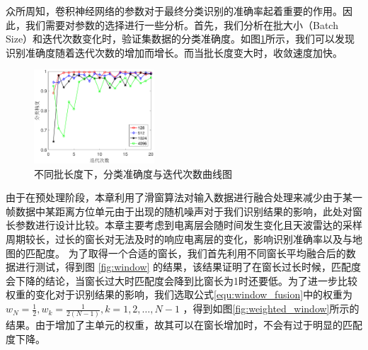 众所周知，卷积神经网络的参数对于最终分类识别的准确率起着重要的作用。因此，我们需要对参数的选择进行一些分析。首先，我们分析在批大小（Batch Size）和迭代次数变化时，验证集数据的分类准确度。如图\ref{fig:epoch}所示，我们可以发现识别准确度随着迭代次数的增加而增长。而当批长度变大时，收敛速度加快。
\begin{figure}[H]
	\centering
	\includegraphics[width=0.4\textwidth]{figures/othr/epoch}
	\caption{不同批长度下，分类准确度与迭代次数曲线图}
	\label{fig:epoch}
\end{figure}

由于在预处理阶段，本章利用了滑窗算法对输入数据进行融合处理来减少由于某一帧数据中某距离方位单元由于出现的随机噪声对于我们识别结果的影响，此处对窗长参数进行设计比较。本章主要考虑到电离层会随时间发生变化且天波雷达的采样周期较长，过长的窗长对无法及时的响应电离层的变化，影响识别准确率以及与地图的匹配度。
为了取得一个合适的窗长，我们首先利用不同窗长平均融合后的数据进行测试，得到图 \ref{fig:window} 的结果，该结果证明了在窗长过长时候，匹配度会下降的结论，当窗长过大时匹配度会降到比窗长为1时还要低。为了进一步比较权重的变化对于识别结果的影响，我们选取公式\ref{equ:window_fusion}中的权重为$w_N=\frac{1}{2},w_k=\frac{1}{2(N-1)},k=1,2,\dots,N-1$
，得到如图\ref{fig:weighted_window}所示的结果。由于增加了主单元的权重，故其可以在窗长增加时，不会有过于明显的匹配度下降。


